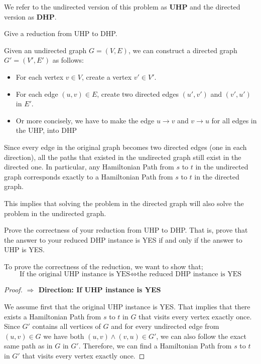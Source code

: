 \documentclass[11pt,fleqn]{exam}
\newenvironment{soln}{\color{solnblue}}{}
\newif\ifsolutions\solutionsfalse
\begin{document}
We refer to the undirected version of this problem as \textbf{UHP} and the directed version as \textbf{DHP}.

\begin{questions}

    \question[3] Give a reduction from UHP to DHP.

      \begin{soln}
      Given an undirected graph $G = (V, E)$, we can construct a directed graph $G' = (V', E')$ as follows:
      \begin{itemize}
          \item For each vertex $v \in V$, create a vertex $v' \in V'$.
          \item For each edge $(u, v) \in E$, create two directed edges $(u', v')$ and $(v', u')$ in $E'$.
          \item Or more concisely, we have to make the edge $u \rightarrow v$ and $v \rightarrow u$ for all edges in the 
          UHP, into DHP
      \end{itemize}
      Since every edge in the original graph becomes two directed edges 
      (one in each direction), all the paths that existed in the undirected 
      graph still exist in the directed one. In particular, 
      any Hamiltonian Path from $s$ to $t$ in the undirected graph corresponds 
      exactly to a Hamiltonian Path from $s$ to $t$ in the directed graph.

      This implies that solving the problem in the directed graph will also 
      solve the problem in the undirected graph.
      \end{soln}

    \ifsolutions\fi

    \question[4] Prove the correctness of your reduction from UHP to DHP. That is, prove that the answer to your reduced DHP instance is YES if and only if the answer to UHP is YES. 

      \begin{soln}
            To prove the correctness of the reduction, we want to show that;
            \[ 
            \text{If the original UHP instance is YES} 
            \iff 
            \text{the reduced DHP instance is YES} 
            \]
            \begin{proof}

                  \textbf{$\Rightarrow$ Direction: If UHP instance is YES}

                  We assume first that the original UHP instance is YES.
                  That implies that there exists a Hamiltonian Path from 
                  $s$ to $t$ in $G$ that visits every vertex exactly once.
                  Since $G\prime$ contains all vertices of $G$ and for every undirected
                  edge from $(u, v) \in G$ we have both $(u, v) \wedge (v, u) \in G\prime$,
                  we can also follow the exact same path as in $G$ in $G\prime$.
                  Therefore, we can find a Hamiltonian Path from $s$ to $t$ in $G\prime$ 
                  that visits every vertex exactly once.


\end{proof}
\end{soln}
\end{questions}
\end{document}
